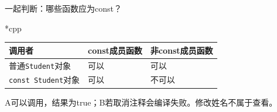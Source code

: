 \begin{frame}{一起判断：哪些函数应为const？}
    \begin{Code}*{cpp}
        
    \end{Code}
    \renewcommand{\arraystretch}{1.2}
    \begin{tabular}{lll}
        \textbf{调用者} & \textbf{const成员函数} & \textbf{非const成员函数}\\
        \hline
        普通\texttt{Student}对象 & 可以 & 可以\\
        \texttt{const Student}对象 & 可以 & 不可以
    \end{tabular}
    \par\medskip
    \alert{A可以调用，结果为true；B若取消注释会编译失败。修改姓名不属于查看。}
\end{frame}
